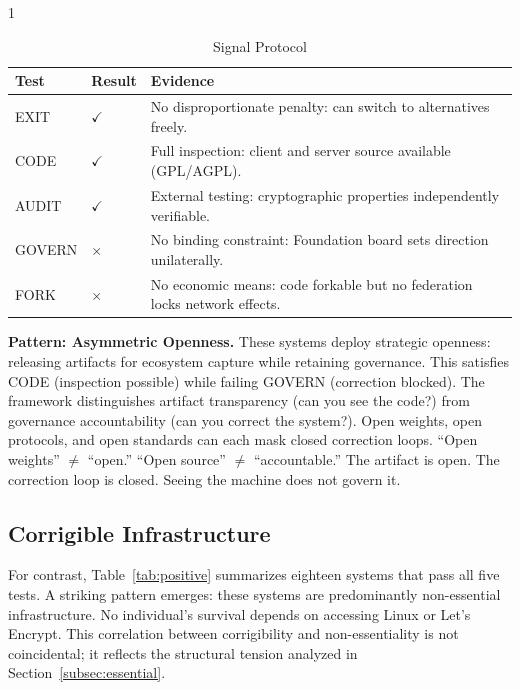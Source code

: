 \documentclass{article}
\begin{document}
\begin{table}[htbp]
    \begin{subtable}{1\textwidth}
        \centering
        \caption{Signal Protocol}
        \small
        \begin{tabular}{@{}llp{8.5cm}@{}}
            \toprule
            \textbf{Test} & \textbf{Result} & \textbf{Evidence} \\
            \midrule
            EXIT & $\checkmark$ & No disproportionate penalty: can switch to alternatives freely. \\
            CODE & $\checkmark$ & Full inspection: client and server source available (GPL/AGPL). \\
            AUDIT & $\checkmark$ & External testing: cryptographic properties independently verifiable. \\
            GOVERN & $\times$ & No binding constraint: Foundation board sets direction unilaterally. \\
            FORK & $\times$ & No economic means: code forkable but no federation locks network effects. \\
            \bottomrule
        \end{tabular}
    \end{subtable}
\end{table}

\textbf{Pattern: Asymmetric Openness.} These systems deploy strategic openness: releasing artifacts for ecosystem capture while retaining governance. This satisfies CODE (inspection possible) while failing GOVERN (correction blocked). The framework distinguishes artifact transparency (can you see the code?) from governance accountability (can you correct the system?). Open weights, open protocols, and open standards can each mask closed correction loops. ``Open weights'' $\neq$ ``open.'' ``Open source'' $\neq$ ``accountable.'' The artifact is open. The correction loop is closed. Seeing the machine does not govern it.

\subsection{Corrigible Infrastructure}

For contrast, Table~\ref{tab:positive} summarizes eighteen systems that pass all five tests. A striking pattern emerges: these systems are predominantly non-essential infrastructure. No individual's survival depends on accessing Linux or Let's Encrypt. This correlation between corrigibility and non-essentiality is not coincidental; it reflects the structural tension analyzed in Section~\ref{subsec:essential}.
\end{document}

